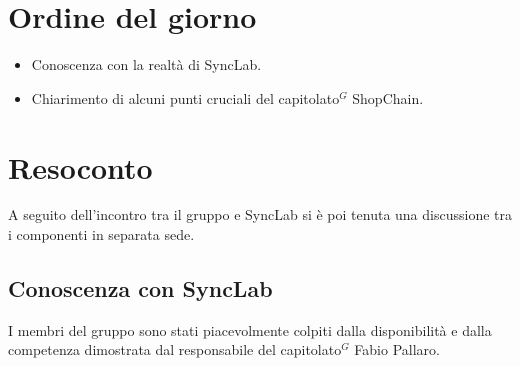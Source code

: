 \section{Ordine del giorno}
\begin{itemize}
    \item Conoscenza con la realtà di SyncLab.
    \item Chiarimento di alcuni punti cruciali del capitolato$^{G}$ ShopChain.
\end{itemize}

\section{Resoconto}
A seguito dell'incontro tra il gruppo e SyncLab si è poi tenuta una discussione tra i componenti in separata sede.

\subsection{Conoscenza con SyncLab}
I membri del gruppo sono stati piacevolmente colpiti dalla disponibilità e dalla competenza dimostrata dal responsabile
del capitolato$^{G}$ Fabio Pallaro.

